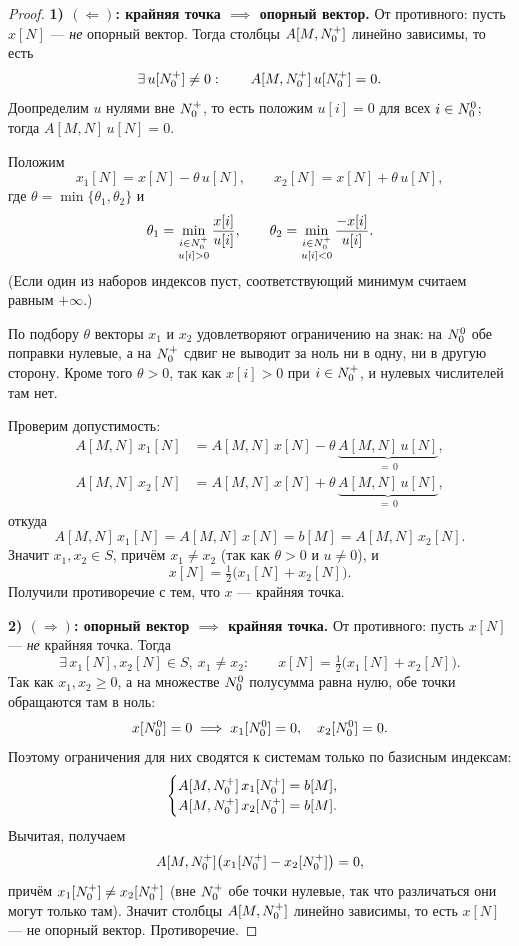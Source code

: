 \begin{proof}
\textbf{1) $(\Longleftarrow)$: крайняя точка $\implies$ опорный вектор.}
От противного: пусть $x[N]$ — \emph{не} опорный вектор. Тогда столбцы
$A[M,N_0^{+}]$ линейно зависимы, то есть
\[
  \exists\, u[N_0^{+}] \ne 0 : \qquad A[M, N_0^{+}]\, u[N_0^{+}] = 0 .
\]
Доопределим $u$ нулями вне $N_0^{+}$, то есть положим $u[i] = 0$ для всех
$i \in N_0^{0}$; тогда $A[M,N]\,u[N] = 0$.

Положим
\[
  x_1[N] = x[N] - \theta\, u[N], \qquad
  x_2[N] = x[N] + \theta\, u[N],
\]
где $\theta = \min\{\theta_1, \theta_2\}$ и
\[
  \theta_1 = \min_{\substack{i \in N_0^{+} \\ u[i] > 0}} \frac{x[i]}{u[i]} ,
  \qquad
  \theta_2 = \min_{\substack{i \in N_0^{+} \\ u[i] < 0}} \frac{-x[i]}{u[i]} .
\]
(Если один из наборов индексов пуст, соответствующий минимум считаем равным
$+\infty$.)

По подбору $\theta$ векторы $x_1$ и $x_2$ удовлетворяют ограничению на знак:
на $N_0^{0}$ обе поправки нулевые, а на $N_0^{+}$ сдвиг не выводит за ноль ни в одну,
ни в другую сторону. Кроме того $\theta > 0$, так как $x[i] > 0$ при $i \in N_0^{+}$,
и нулевых числителей там нет.

Проверим допустимость:
\begin{align*}
  A[M,N]\,x_1[N] &= A[M,N]\,x[N] - \theta\,\underbrace{A[M,N]\,u[N]}_{=\,0} , \\
  A[M,N]\,x_2[N] &= A[M,N]\,x[N] + \theta\,\underbrace{A[M,N]\,u[N]}_{=\,0} ,
\end{align*}
откуда
\[
  A[M,N]\,x_1[N] = A[M,N]\,x[N] = b[M] = A[M,N]\,x_2[N] .
\]
Значит $x_1, x_2 \in S$, причём $x_1 \ne x_2$ (так как $\theta > 0$ и $u \ne 0$), и
\[
  x[N] = \tfrac{1}{2}\big(x_1[N] + x_2[N]\big) .
\]
Получили противоречие с тем, что $x$ — крайняя точка.

\medskip
\textbf{2) $(\Longrightarrow)$: опорный вектор $\implies$ крайняя точка.}
От противного: пусть $x[N]$ — \emph{не} крайняя точка. Тогда
\[
  \exists\, x_1[N], x_2[N] \in S,\ x_1 \ne x_2 : \qquad
  x[N] = \tfrac{1}{2}\big(x_1[N] + x_2[N]\big) .
\]
Так как $x_1, x_2 \ge 0$, а на множестве $N_0^{0}$ полусумма равна нулю, обе точки
обращаются там в ноль:
\[
  x[N_0^{0}] = 0 \implies x_1[N_0^{0}] = 0, \quad x_2[N_0^{0}] = 0 .
\]
Поэтому ограничения для них сводятся к системам только по базисным индексам:
\[
  \begin{cases}
    A[M, N_0^{+}]\, x_1[N_0^{+}] = b[M], \\
    A[M, N_0^{+}]\, x_2[N_0^{+}] = b[M] .
  \end{cases}
\]
Вычитая, получаем
\[
  A[M, N_0^{+}]\big(x_1[N_0^{+}] - x_2[N_0^{+}]\big) = 0 ,
\]
причём $x_1[N_0^{+}] \ne x_2[N_0^{+}]$ (вне $N_0^{+}$ обе точки нулевые, так что различаться
они могут только там). Значит столбцы $A[M,N_0^{+}]$ линейно зависимы, то есть
$x[N]$ — не опорный вектор. Противоречие.
\end{proof}

